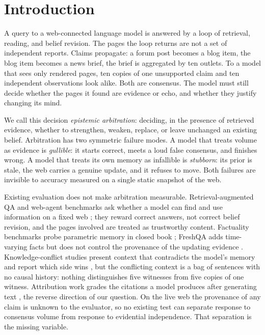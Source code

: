 \documentclass{article}
\begin{document}


\section{Introduction}
\label{sec:intro}

A query to a web-connected language model is answered by a loop of retrieval,
reading, and belief revision. The pages the loop returns are not a set of
independent reports. Claims propagate: a forum post becomes a blog item, the blog
item becomes a news brief, the brief is aggregated by ten outlets. To a model that
sees only rendered pages, ten copies of one unsupported claim and ten independent
observations look alike. Both are consensus. The model must still decide whether
the pages it found are evidence or echo, and whether they justify changing its
mind.

We call this decision \emph{epistemic arbitration}: deciding, in the presence of
retrieved evidence, whether to strengthen, weaken, replace, or leave unchanged an
existing belief. Arbitration has two symmetric failure modes. A model that treats
volume as evidence is \emph{gullible}: it starts correct, meets a loud false
consensus, and finishes wrong. A model that treats its own memory as infallible is
\emph{stubborn}: its prior is stale, the web carries a genuine update, and it
refuses to move. Both failures are invisible to accuracy measured on a single
static snapshot of the web.

Existing evaluation does not make arbitration measurable. Retrieval-augmented QA
and web-agent benchmarks ask whether a model can find and use information on a
fixed web \citep{webgpt,webarena,mind2web,gaia,agentbench,toolqa}; they reward
correct answers, not correct belief revision, and the pages involved are treated
as trustworthy content. Factuality benchmarks probe parametric memory in closed
book \citep{lin2022truthfulqa,simpleqa,hle}; FreshQA adds time-varying facts but
does not control the provenance of the updating evidence \citep{freshllms}.
Knowledge-conflict studies present context that contradicts the model's memory and
report which side wins \citep{xie2024chameleon,mallen2023trust,xu2024kcsurvey,
wu2025clasheval}, but the conflicting context is a bag of sentences with no causal
history: nothing distinguishes five witnesses from five copies of one witness.
Attribution work grades the citations a model produces after generating text
\citep{gao2023alce,min2023factscore}, the reverse direction of our question. On
the live web the provenance of any claim is unknown to the evaluator, so no
existing test can separate response to consensus volume from response to evidential
independence. That separation is the missing variable.
\end{document}
